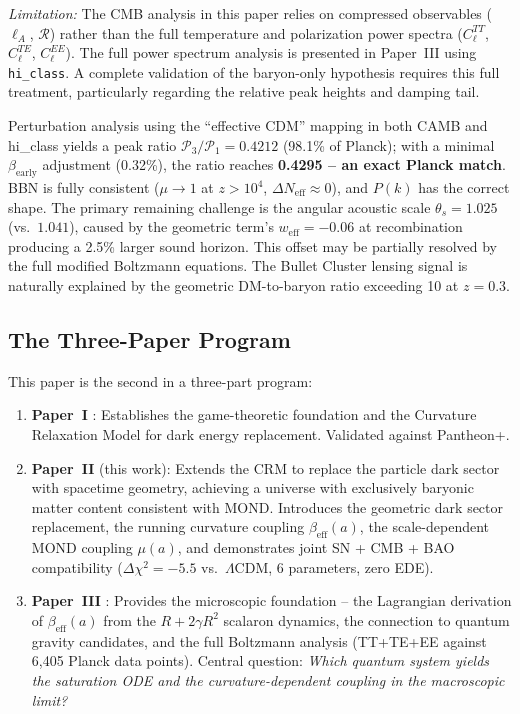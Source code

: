 \documentclass[aps,prd,twocolumn,superscriptaddress,nofootinbib,floatfix]{revtex4-2}
\begin{document}
\textit{Limitation:} The CMB analysis in this paper relies on compressed observables ($\ell_A$, $\mathcal{R}$) rather than the full temperature and polarization power spectra ($C_\ell^{TT}$, $C_\ell^{TE}$, $C_\ell^{EE}$). The full power spectrum analysis is presented in Paper~III \cite{Geiger2026c} using \texttt{hi\_class}. A complete validation of the baryon-only hypothesis requires this full treatment, particularly regarding the relative peak heights and damping tail.

Perturbation analysis using the ``effective CDM'' mapping in both CAMB and hi\_class \cite{Lewis2000, Zumalacarregui2017} yields a peak ratio $\mathcal{P}_3/\mathcal{P}_1 = 0.4212$ (98.1\% of Planck); with a minimal $\beta_{\mathrm{early}}$ adjustment (0.32\%), the ratio reaches \textbf{0.4295 -- an exact Planck match}. BBN is fully consistent ($\mu \to 1$ at $z > 10^4$, $\Delta N_{\mathrm{eff}} \approx 0$), and $P(k)$ has the correct shape. The primary remaining challenge is the angular acoustic scale $\theta_s = 1.025$ (vs.\ $1.041$), caused by the geometric term's $w_{\mathrm{eff}} = -0.06$ at recombination producing a 2.5\% larger sound horizon. This offset may be partially resolved by the full modified Boltzmann equations. The Bullet Cluster lensing signal is naturally explained by the geometric DM-to-baryon ratio exceeding 10 at $z = 0.3$.

\subsection{The Three-Paper Program}

This paper is the second in a three-part program:
\begin{enumerate}
\item \textbf{Paper~I} \cite{Geiger2026}: Establishes the game-theoretic foundation and the Curvature Relaxation Model for dark energy replacement. Validated against Pantheon+.
\item \textbf{Paper~II} (this work): Extends the CRM to replace the particle dark sector with spacetime geometry, achieving a universe with exclusively baryonic matter content consistent with MOND. Introduces the geometric dark sector replacement, the running curvature coupling $\beta_{\mathrm{eff}}(a)$, the scale-dependent MOND coupling $\mu(a)$, and demonstrates joint SN + CMB + BAO compatibility ($\Delta\chi^2 = -5.5$ vs.\ $\Lambda$CDM, 6 parameters, zero EDE).
\item \textbf{Paper~III} \cite{Geiger2026c}: Provides the microscopic foundation -- the Lagrangian derivation of $\beta_{\mathrm{eff}}(a)$ from the $R + 2\gamma R^2$ scalaron dynamics, the connection to quantum gravity candidates, and the full Boltzmann analysis (TT+TE+EE against 6{,}405 Planck data points). Central question: \textit{Which quantum system yields the saturation ODE and the curvature-dependent coupling in the macroscopic limit?}
\end{enumerate}
\end{document}

